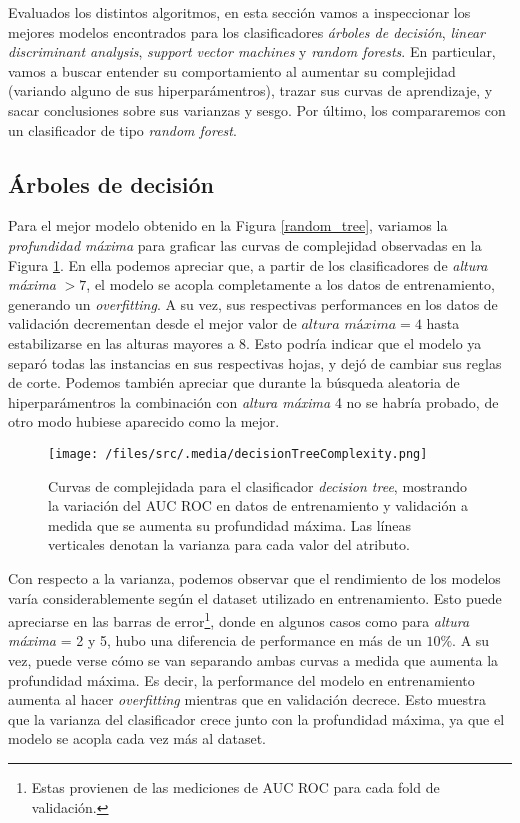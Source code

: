 Evaluados los distintos algoritmos, en esta sección vamos a inspeccionar los mejores modelos encontrados para los clasificadores \textit{árboles de decisión}, \textit{linear discriminant analysis}, \textit{support vector machines} y \textit{random forests}. En particular, vamos a buscar entender su comportamiento al aumentar su complejidad (variando alguno de sus hiperparámentros), trazar sus curvas de aprendizaje, y sacar conclusiones sobre sus varianzas y sesgo. Por último, los compararemos con un clasificador de tipo \textit{random forest}.

\subsection{Árboles de decisión}
Para el mejor modelo obtenido en la Figura \ref{random_tree}, variamos la \textit{profundidad máxima} para graficar las curvas de complejidad observadas en la Figura \ref{decisionTreeComplexity}. En ella podemos apreciar que, a partir de los clasificadores de \textit{altura máxima} $> 7$, el modelo se acopla completamente a los datos de entrenamiento, generando un \textit{overfitting}. A su vez, sus respectivas performances en los datos de validación decrementan desde el mejor valor de $\textit{altura máxima} = 4$ hasta estabilizarse en las alturas mayores a 8. Esto podría indicar que el modelo ya separó todas las instancias en sus respectivas hojas, y dejó de cambiar sus reglas de corte. Podemos también apreciar que durante la búsqueda aleatoria de hiperparámentros la combinación con \textit{altura máxima} 4 no se habría probado, de otro modo hubiese aparecido como la mejor.  
\begin{figure}[!htbp]
    \centering
    \texttt{[image: /files/src/.media/decisionTreeComplexity.png]}
    \caption{Curvas de complejidada para el clasificador \textit{decision tree}, mostrando la variación del AUC ROC en datos de entrenamiento y validación a medida que se aumenta su profundidad máxima. Las líneas verticales denotan la varianza para cada valor del atributo.}
    \label{decisionTreeComplexity}
\end{figure}

Con respecto a la varianza, podemos observar que el rendimiento de los modelos varía considerablemente según el dataset utilizado en entrenamiento. Esto puede apreciarse en las barras de error\footnote{Estas provienen de las mediciones de AUC ROC para cada fold de validación.}, donde en algunos casos como para \textit{altura máxima} = 2 y 5, hubo una diferencia de performance en más de un $10\%$. A su vez, puede verse cómo se van separando ambas curvas a medida que aumenta la profundidad máxima. Es decir, la performance del modelo en entrenamiento aumenta al hacer \textit{overfitting} mientras que en validación decrece. Esto muestra que la varianza del clasificador crece junto con la profundidad máxima, ya que el modelo se acopla cada vez más al dataset.

